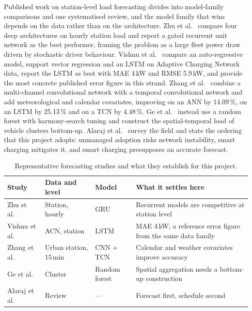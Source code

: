\documentclass[10pt,a4paper]{article}
\begin{document}
Published work on station-level load forecasting divides into model-family comparisons and one
systematised review, and the model family that wins depends on the data rather than on the
architecture. Zhu et al.~\cite{Zhu2019ShortTermEVLoadDL} compare four deep architectures on hourly
station load and report a gated recurrent unit network as the best performer, framing the problem
as a large fleet power draw driven by stochastic driver behaviour.
Vishnu et al.~\cite{Vishnu2023ShortTermEVLoadTSMLDL} compare an auto-regressive model, support
vector regression and an LSTM on Adaptive Charging Network data, report the LSTM as best with
MAE 4\,kW and RMSE 5.9\,kW, and provide the most concrete published error figure in this strand.
Zhang et al.~\cite{Zhang2022MCCNNTCN} combine a multi-channel convolutional network with a temporal
convolutional network and add meteorological and calendar covariates, improving on an ANN by
14.09\,\%, on an LSTM by 25.13\,\% and on a TCN by 4.48\,\%. Ge et
al.~\cite{Ge2020SpatialTemporalEVLoadProfile} instead use a random forest with harmony-search
tuning and construct the spatial-temporal load of vehicle clusters bottom-up.
Alaraj et al.~\cite{Alaraj2025MLChargingDemandReview} survey the field and state the ordering that
this project adopts: unmanaged adoption risks network instability, smart charging mitigates it, and
smart charging presupposes an accurate forecast.

\begin{table}[H]
\centering
\caption{Representative forecasting studies and what they establish for this project.}
\label{tab:lit}
\small
\renewcommand{\arraystretch}{1.15}
\begin{tabular}{@{}p{3.3cm}p{3.6cm}p{3.0cm}p{5.0cm}@{}}
\toprule
Study & Data and level & Model & What it settles here \\
\midrule
Zhu et al.~\cite{Zhu2019ShortTermEVLoadDL} & Station, hourly & GRU & Recurrent models are competitive at station level \\
Vishnu et al.~\cite{Vishnu2023ShortTermEVLoadTSMLDL} & ACN, station & LSTM & MAE 4\,kW; a reference error figure from the same data family \\
Zhang et al.~\cite{Zhang2022MCCNNTCN} & Urban station, 15\,min & CNN + TCN & Calendar and weather covariates improve accuracy \\
Ge et al.~\cite{Ge2020SpatialTemporalEVLoadProfile} & Cluster & Random forest & Spatial aggregation needs a bottom-up construction \\
Alaraj et al.~\cite{Alaraj2025MLChargingDemandReview} & Review & --- & Forecast first, schedule second \\
\bottomrule
\end{tabular}
\end{table}
\end{document}
